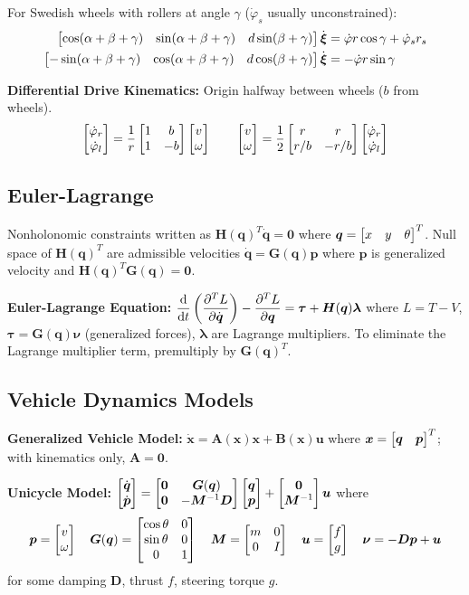 \documentclass[twocolumn, 8pt]{extarticle}
\begin{document}
For Swedish wheels with rollers at angle \(\gamma\) (\(\dot\varphi _s\) usually unconstrained):
\begin{align*}
  \rvec{\cos(\alpha + \beta + \gamma)}{\sin(\alpha + \beta + \gamma)}{d\sin(\beta + \gamma)}\dot{\bm\xi} &= \dot\varphi r\cos\gamma + \dot\varphi _sr_s \\
	\rvec{-\sin(\alpha + \beta + \gamma)}{\cos(\alpha + \beta + \gamma)}{d\cos(\beta + \gamma)}\dot{\bm \xi} &= -\dot\varphi r\sin\gamma
\end{align*}

\textbf{Differential Drive Kinematics:} Origin halfway between wheels (\(b\) from wheels).
\[
\cvec{\dot\varphi _r}{\dot\varphi _l} = \frac{1}{r}\mattwo{1}{b}{1}{-b}\cvec{v}{\omega} \qquad \cvec{v}{\omega} = \frac{1}{2}\mattwo{r}{r}{r/b}{-r/b}\cvec{\dot\varphi _r}{\dot\varphi _l}
\]

\subsection{Euler-Lagrange}

Nonholonomic constraints written as \(\bm H(\bm q)^T\dot{\bm q} = \bm 0\) where \(\bm q = \rvec{x}{y}{\theta}^T\).
Null space of \(\bm H(\bm q)^T\) are admissible velocities \(\dot{\bm q} = \bm G(\bm q)\bm p\) where \(\bm p\) is
generalized velocity and \(\bm H(\bm q)^T\bm G(\bm q) = \bm 0\).

\textbf{Euler-Lagrange Equation:} \(\displaystyle \frac{\mathrm{d}}{\mathrm{d}t}\left(\frac{\partial^TL}{\partial\dot{\bm q}}\right) - \frac{\partial^TL}{\partial\bm q} = \bm\tau + \bm H(\bm q)\bm\lambda\)
where \(L = T - V\), \(\bm\tau = \bm G(\bm q)\bm\nu\) (generalized forces), \(\bm\lambda\) are Lagrange multipliers.
To eliminate the Lagrange multiplier term, premultiply by \(\bm G(\bm q)^T\).

\subsection{Vehicle Dynamics Models}

\textbf{Generalized Vehicle Model:} \(\dot{\bm x} = \bm A(\bm x)\bm x + \bm B(\bm x)\bm u\) where \(\bm x = \rvec{\bm q}{\bm p}^T\);
with kinematics only, \(\bm A = \bm 0\).

\textbf{Unicycle Model:} \(\cvec{\dot{\bm q}}{\dot{\bm p}} = \mattwo{\bm 0}{\bm G(\bm q)}{\bm 0}{-\bm M^{-1}\bm D}\cvec{\bm q}{\bm p} + \cvec{\bm 0}{\bm M^{-1}}\bm u\)
where
\[\bm p = \cvec{v}{\omega} \quad \bm G(\bm q) = \matthreetwo{\cos\theta}{0}{\sin\theta}{0}{0}{1} \quad
\bm M = \mattwo{m}{0}{0}{I} \quad \bm u = \cvec{f}{g} \quad \bm\nu = -\bm D\bm p + \bm u\]
for some damping \(\bm D\), thrust \(f\), steering torque \(g\).
\end{document}
